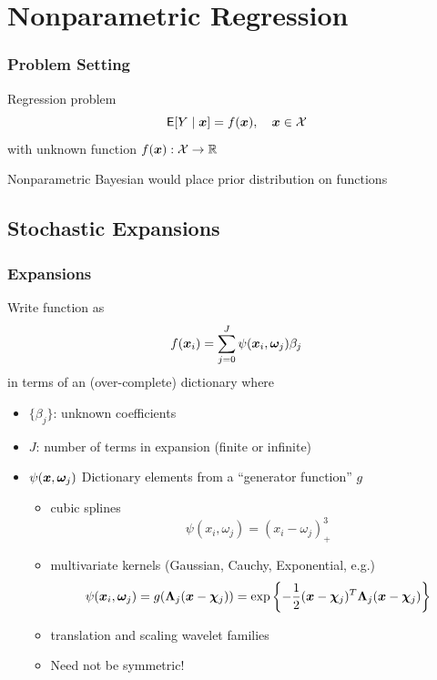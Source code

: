 \documentclass[handout]{beamer}
\newcommand{\bs}[2]{\begin{frame} \frametitle{#1}
{#2}
\end{frame} }
\begin{document}
\section{Nonparametric Regression}

\bs{Problem Setting}{
Regression problem
$$ {\sf{E}}[Y \mid \bm x] = f(\bm x), \quad \bm x \in \mathcal{X}$$
with unknown function $f(\bm x): \mathcal{X} \to \mathbb{R}$ \pause


\vspace{.5in}
Nonparametric Bayesian would place  prior distribution on functions


}

\subsection{Stochastic Expansions}
\bs{Expansions} {

Write function as
 $$f(\bm x_i) = \sum_{j=0}^{J}  \psi(\bm x_i, \bm \omega_j)\beta_j$$ in
terms of an (over-complete) dictionary where \pause

  \begin{itemize}
   \item  $\{\beta_j\}$:  unknown coefficients \pause
   \item  $J$: number of terms in expansion (finite or infinite) \pause


 \item $\psi(\bm x,\bm \omega_j)$   Dictionary elements from
a ``generator function'' $g$ \pause
  \begin{itemize}
  \item cubic splines
$$   \psi(x_i, \omega_j) =  (x_i - \omega_j)^3_+$$ \pause
  \item multivariate kernels  (Gaussian, Cauchy, Exponential, e.g.)
$$  \psi(\bm x_i, \bm \omega_j) =  g(
\bm \Lambda_j (\bm x - \bm \chi_j)) = \exp\left\{-\frac{1}{2}(\bm x - \bm \chi_j)^T \bm \Lambda_j (\bm x -
  \bm \chi_j)\right\}$$  \pause
  \item translation and scaling wavelet families  \pause

\item Need not be symmetric!
  \end{itemize}
  \end{itemize}


}
\end{document}
